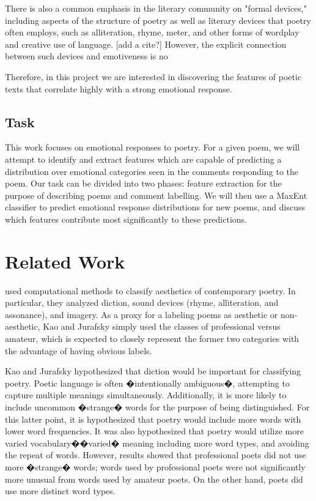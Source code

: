 \documentclass[11pt]{article}
\begin{document}
There is also a common emphasis in the literary community on "formal devices," including aspects of the structure of poetry as well as literary devices that poetry often employs, such as alliteration, rhyme, meter, and other forms of wordplay and creative use of language. [add a cite?] However, the explicit connection between such devices and emotiveness is no

Therefore, in this project we are interested in discovering the features of poetic texts that correlate highly with a strong emotional response.


\subsection*{Task}
This work focuses on emotional responses to poetry. For a given poem, we will attempt to identify and extract features which are capable of predicting a distribution over emotional categories seen in the comments responding to the poem. Our task can be divided into two phases: feature extraction for the purpose of describing poems and comment labelling. We will then use a MaxEnt classifier to predict emotional response distributions for new poems, and discuss which features contribute most significantly to these predictions.



\section{Related Work}

 used computational methods to classify aesthetics of contemporary poetry. In particular, they analyzed diction, sound devices (rhyme, alliteration, and assonance), and imagery. As a proxy for a labeling poems as aesthetic or non-aesthetic, Kao and Jurafsky simply used the classes of professional versus amateur, which is expected to closely represent the former two categories with the advantage of having obvious labels.

Kao and Jurafsky hypothesized that diction would be important for classifying poetry. Poetic language is often �intentionally ambiguous�, attempting to capture multiple meanings simultaneously. Additionally, it is more likely to include uncommon �strange� words for the purpose of being distinguished. For this latter point, it is hypothesized that poetry would include more words with lower word frequencies. It was also hypothesized that poetry would utilize more varied vocabulary��varied� meaning including more word types, and avoiding the repeat of words. However, results showed that professional poets did not use more �strange� words; words used by professional poets were not significantly more unusual from words used by amateur poets. On the other hand, poets did use more distinct word types.
\end{document}
